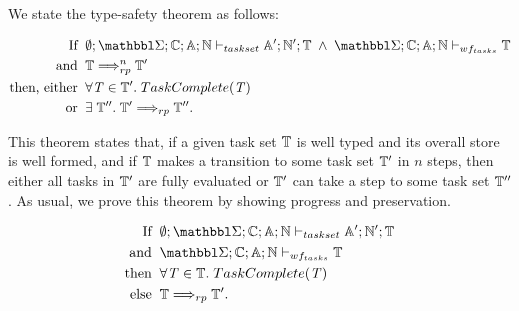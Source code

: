 We state the type-safety theorem as follows:
%
\begin{theorem}
  \label{theorem:type-safety}
  \begin{displaymath}
  \begin{aligned}
  \text{If} \;\; & \emptyset;\SENVMAP;\CENVMAP;\AENVMAP;\NENVMAP \vdash_{taskset} \AENVMAP' ; \NENVMAP' ; \TASKSET \; \wedge \; \SENVMAP;\CENVMAP;\AENVMAP;\NENVMAP \storewftasks{\TASKSET} \\
  \text{and} \;\; & \TASKSET \rparstepsto^{n} \TASKSET' \\
  \text{then, either} \;\; & \forall \TASKVAR \in \TASKSET'. \; \taskcomplete{\TASKVAR} \\
  \text{or} \;\; & \exists \; \TASKSET''. \; \TASKSET' \rparstepsto \TASKSET''.
  \end{aligned}
  \end{displaymath}
\end{theorem}
%
This theorem states that, if a given task set $\mathbb{T}$ is well typed
and its overall store is well formed, and if $\mathbb{T}$
makes a transition to some task set $\mathbb{T}'$ in $n$ steps,
then either all tasks in
$\mathbb{T}'$ are fully evaluated or $\mathbb{T}'$ can take
a step to some task set $\mathbb{T}''$.
%
As usual, we prove this theorem by showing progress and preservation.


\begin{lemma}
  \label{lemma:single-task-progress}
  \begin{displaymath}
  \begin{aligned}
  \text{If} \;\; & \emptyset;\SENVMAP;\CENVMAP;\AENVMAP;\NENVMAP \tctaskset \AENVMAP' ; \NENVMAP' ; \TASKSET \\
  \text{and} \;\; & \SENVMAP;\CENVMAP;\AENVMAP;\NENVMAP \storewftasks{\TASKSET} \\
  \text{then} \;\; & \forall \TASKVAR \in \TASKSET.\; \taskcomplete{\TASKVAR} \\
  \text{else} \;\; & \TASKSET \rparstepsto \TASKSET'.
  \end{aligned}
  \end{displaymath}
\end{lemma}

